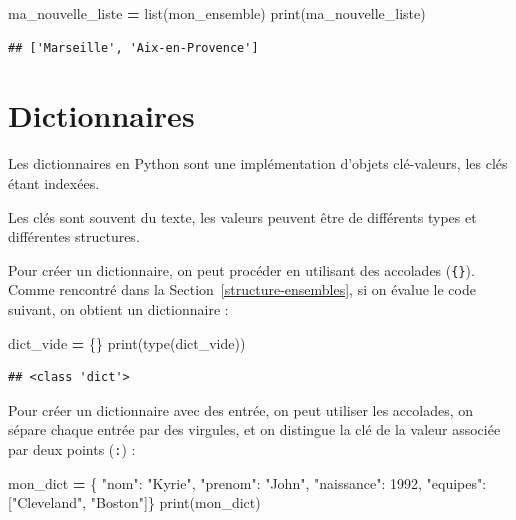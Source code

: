 \documentclass[12pt,]{book}
\newenvironment{Shaded}{\begin{snugshade}}{\end{snugshade}}
\newcommand{\DecValTok}[1]{\textcolor[rgb]{0.00,0.00,0.81}{#1}}
\newcommand{\StringTok}[1]{\textcolor[rgb]{0.31,0.60,0.02}{#1}}
\newcommand{\OperatorTok}[1]{\textcolor[rgb]{0.81,0.36,0.00}{\textbf{#1}}}
\newcommand{\BuiltInTok}[1]{#1}
\newcommand{\NormalTok}[1]{#1}
\numberwithin{equation}{section}
\numberwithin{countremarque}{section}
\begin{document}
\begin{Shaded}
\begin{Highlighting}[]
\NormalTok{ma_nouvelle_liste }\OperatorTok{=} \BuiltInTok{list}\NormalTok{(mon_ensemble)}
\BuiltInTok{print}\NormalTok{(ma_nouvelle_liste)}
\end{Highlighting}
\end{Shaded}

\begin{lstlisting}
## ['Marseille', 'Aix-en-Provence']
\end{lstlisting}

\section{Dictionnaires}\label{type-dict}

Les dictionnaires en Python sont une implémentation d'objets
clé-valeurs, les clés étant indexées.

Les clés sont souvent du texte, les valeurs peuvent être de différents
types et différentes structures.

Pour créer un dictionnaire, on peut procéder en utilisant des accolades
(\texttt{\{\}}). Comme rencontré dans la
Section~\ref{structure-ensembles}, si on évalue le code suivant, on
obtient un dictionnaire :

\begin{Shaded}
\begin{Highlighting}[]
\NormalTok{dict_vide }\OperatorTok{=}\NormalTok{ \{\}}
\BuiltInTok{print}\NormalTok{(}\BuiltInTok{type}\NormalTok{(dict_vide))}
\end{Highlighting}
\end{Shaded}

\begin{lstlisting}
## <class 'dict'>
\end{lstlisting}

Pour créer un dictionnaire avec des entrée, on peut utiliser les
accolades, on sépare chaque entrée par des virgules, et on distingue la
clé de la valeur associée par deux points (\texttt{:}) :

\begin{Shaded}
\begin{Highlighting}[]
\NormalTok{mon_dict }\OperatorTok{=}\NormalTok{ \{ }\StringTok{"nom"}\NormalTok{: }\StringTok{"Kyrie"}\NormalTok{,}
  \StringTok{"prenom"}\NormalTok{: }\StringTok{"John"}\NormalTok{,}
  \StringTok{"naissance"}\NormalTok{: }\DecValTok{1992}\NormalTok{,}
  \StringTok{"equipes"}\NormalTok{: [}\StringTok{"Cleveland"}\NormalTok{, }\StringTok{"Boston"}\NormalTok{]\}}
\BuiltInTok{print}\NormalTok{(mon_dict)}
\end{Highlighting}
\end{Shaded}
\end{document}
